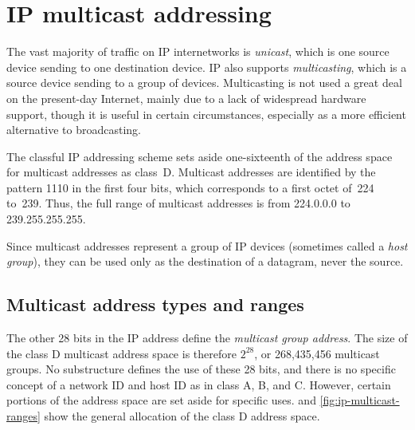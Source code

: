 \section{IP multicast addressing}

The vast majority of traffic on IP internetworks is {\emph{unicast}}, which is one source device sending to one destination device.
IP also supports \emph{multicasting}, which is a source device sending to a group of devices.
Multicasting is not used a great deal on the present-day Internet, mainly due to a lack of widespread hardware support,
though it is useful in certain circumstances, especially as a more efficient alternative to broadcasting.

The classful IP addressing scheme sets aside one-sixteenth of the address space for multicast addresses as class~D.
Multicast addresses are identified by the pattern 1110 in the first four bits, which corresponds to a first octet of~224 to~239.
Thus, the full range of multicast addresses is from 224.0.0.0 to 239.255.255.255.

Since multicast addresses represent a group of IP devices (sometimes called a \emph{host group}),
they can be used only as the destination of a datagram, never the source.



\subsection{Multicast address types and ranges}

The other 28 bits in the IP address define the \emph{multicast group address}.
The size of the class D multicast address space is therefore $2^{28}$, or 268,435,456 multicast groups.
No substructure defines the use of these 28 bits, and there is no specific
concept of a network ID and host ID as in class A, B, and C.
However, certain portions of the address space are set aside for specific uses.
 and \vref{fig:ip-multicast-ranges} show the general allocation of the class D address space.



